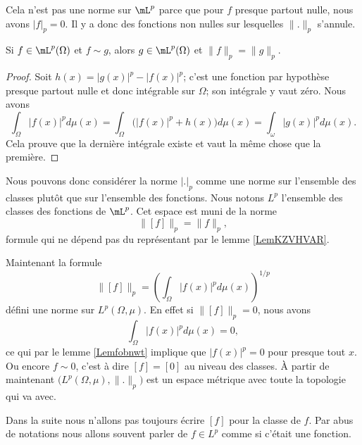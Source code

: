     Cela n'est pas une norme sur \( \mL^p\) parce que pour \( f\) presque partout nulle, nous avons \( | f |_p=0\). Il y a donc des fonctions non nulles sur lesquelles \( \| . \|_p\) s'annule.

\begin{lemma}       \label{LemKZVHVAR}
    Si \( f\in \mL^p(\Omega)\) et \( f\sim g\), alors \( g\in \mL^p(\Omega)\) et \( \| f \|_p=\| g \|_p\).
\end{lemma}

\begin{proof}
    Soit \( h(x)=| g(x) |^p-| f(x) |^p\); c'est une fonction par hypothèse presque partout nulle et donc intégrable sur \( \Omega\); son intégrale y vaut zéro. Nous avons
    \begin{equation}
        \int_{\Omega}| f(x) |^pd\mu(x)=\int_{\Omega}\Big( | f(x) |^p+h(x)\big)d\mu(x)=\int_{\omega}| g(x) |^pd\mu(x).
    \end{equation}
    Cela prouve que la dernière intégrale existe et vaut la même chose que la première.
\end{proof}

Nous pouvons donc considérer la norme \( | . |_p\) comme une norme sur l'ensemble des classes plutôt que sur l'ensemble des fonctions. Nous notons \( L^p\) l'ensemble des classes des fonctions de \(\mL^p\). Cet espace est muni de la norme
\begin{equation}
    \| [f] \|_p=\| f \|_p,
\end{equation}
formule qui ne dépend pas du représentant par le lemme \ref{LemKZVHVAR}.

Maintenant la formule
\begin{equation}
    \| [f] \|_p=\left( \int_{\Omega}| f(x) |^pd\mu(x) \right)^{1/p}
\end{equation}
défini une norme sur \( L^p(\Omega,\mu)\). En effet si \( \| [f] \|_p=0\), nous avons
\begin{equation}
    \int_{\Omega}| f(x) |^pd\mu(x)=0,
\end{equation}
ce qui par le lemme \ref{Lemfobnwt} implique que \( | f(x) |^p=0\) pour presque tout \( x\). Ou encore \( f\sim 0\), c'est à dire \( [f]=[0]\) au niveau des classes. À partir de maintenant \( \big( L^p(\Omega,\mu),\| . \|_p \big)\) est un espace métrique avec toute la topologie qui va avec.

Dans la suite nous n'allons pas toujours écrire \( [f]\) pour la classe de \( f\). Par abus de notations nous allons souvent parler de \( f\in L^p\) comme si c'était une fonction.

